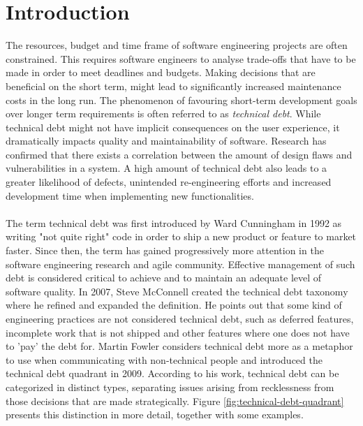 \chapter{Introduction}


The resources, budget and time frame of software engineering projects are often constrained\cite{guo2011tracking}.
This requires software engineers to analyse trade-offs that have to be made in order to meet deadlines and budgets.
Making decisions that are beneficial on the short term, might lead to significantly increased maintenance costs in the long run.
The phenomenon of favouring short-term development goals over longer term requirements is often referred to as \emph{technical debt}.
While technical debt might not have implicit consequences on the user experience, it dramatically impacts quality and maintainability of software.
Research has confirmed that there exists a correlation between the amount of design flaws and vulnerabilities in a system\cite{nord2016debtvulnerabilities}.
A high amount of technical debt also leads to a greater likelihood of defects, unintended re-engineering efforts\cite{li2014empirical} and increased development time when implementing new functionalities.\\\\
The term technical debt was first introduced by Ward Cunningham in 1992 as writing "not quite right" code in order to ship a new product or feature to market faster\cite{cunningham1993wycash}.
Since then, the term has gained progressively more attention in the software engineering research and agile community.
Effective management of such debt is considered critical to achieve and to maintain an adequate level of software quality.
In 2007, Steve McConnell created the technical debt taxonomy where he refined and expanded the definition\cite{mcconnell2007debt}.
He points out that some kind of engineering practices are not considered technical debt, such as deferred features, incomplete work that is not shipped and other features where one does not have to 'pay' the debt for.
Martin Fowler considers technical debt more as a metaphor to use when communicating with non-technical people and introduced the technical debt quadrant in 2009\cite{technicaldebtquadrant}.
According to his work, technical debt can be categorized in distinct types, separating issues arising from recklessness from those decisions that are made strategically. 
Figure \ref{fig:technical-debt-quadrant} presents this distinction in more detail, together with some examples.\\

